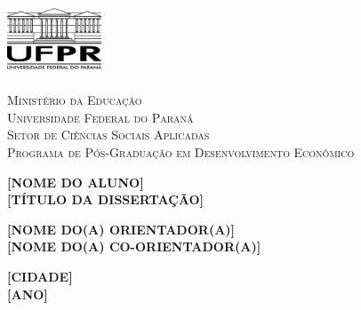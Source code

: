 \documentclass[a4paper, 11pt]{article}
\begin{document}
	\colorbox{white!10!}{
		\begin{minipage}[l]{0.169 \textwidth}
			\begin{flushleft}
				\includegraphics[width=1.1in,height=0.85in]{./Imagens/logo_UFPR.png}
			\end{flushleft}
		\end{minipage}
		\begin{minipage}[l]{0.75 \textwidth}
			\begin{flushleft}
				{\large \textsc{Ministério da Educação}}
				\\
				{\large \textsc{Universidade Federal do Paraná}}
				\\
				\large \textsc{Setor de Ciências Sociais Aplicadas}
				\\
				\large \textsc{Programa de Pós-Graduação em Desenvolvimento Econômico}
			\end{flushleft}
		\end{minipage}
	}

\thispagestyle{empty}

\begin{center}
	\vspace{2cm}
	\textbf{[NOME DO ALUNO]} \\
	\vspace{5cm}
	\textbf{[TÍTULO DA DISSERTAÇÃO]} \\
\end{center}
\begin{flushright}
	\vspace{5cm}
	\textbf{[NOME DO(A) ORIENTADOR(A)]} \\
	\textbf{[NOME DO(A) CO-ORIENTADOR(A)]} \\
\end{flushright}
\begin{center}
	\vspace{5cm}
	\textbf{[CIDADE]} \\
	\textbf{[ANO]}
\end{center}

\nocite{sotomayor21, dolevchenko09}



\end{document}
